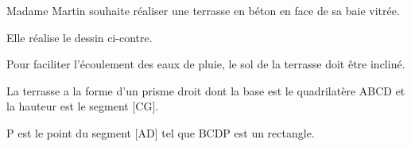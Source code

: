 
\medskip

\begin{minipage}{5cm}
		Madame Martin souhaite réaliser une terrasse en béton en face de sa baie vitrée.
	
\medskip
	
Elle réalise le dessin ci-contre.
	
\smallskip
	
Pour faciliter l'écoulement des eaux de pluie, le sol de la terrasse doit être incliné.
	
\smallskip
	
La terrasse a la forme d'un prisme droit dont la base est le quadrilatère ABCD et la hauteur est le segment [CG].
	
\smallskip
	
P est le point du segment [AD] tel que BCDP est un rectangle.
\end{minipage}
